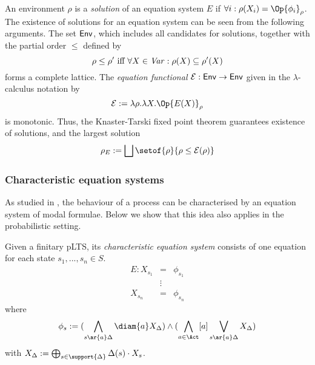 \documentclass{article}
\def \Var{{\it Var}}
\newcommand{\Env}{{\sf Env}}
\def \CE{{\cal E}}
\newcommand{\boxm}[1]{[#1]}
\begin{document}
An environment $\rho$ is a {\em solution} of an equation system $E$
if $\forall i:\rho(X_i) = \Op{\phi_i}_\rho$. The existence of
solutions for an equation system can be seen from the following
arguments. The set $\Env$, which includes all candidates for
solutions, together with the partial order $\leq$ defined by
\[\rho\leq\rho'\ \mbox{\rm  iff}\ \forall
X\in\Var:\rho(X)\subseteq\rho'(X)\] forms a complete lattice. The
{\em equation functional} $\CE:\Env\rightarrow \Env$ given in the
$\lambda$-calculus notation by \[\CE:=\lambda\rho.\lambda
X.\Op{E(X)}_\rho\] is monotonic. Thus, the Knaster-Tarski fixed
point theorem guarantees existence of solutions, and the largest
solution
\[\rho_E:= \bigsqcup \setof{\rho}{\rho\leq\CE(\rho)}\]


\subsubsection{Characteristic equation systems}\label{s:ces} As
studied in \cite{SI94}, the behaviour of a process can be
characterised by an equation system of modal formulae. Below we show
that this idea also applies in the probabilistic setting.

\begin{definition}\label{d:cess}
Given a finitary  pLTS, its {\em characteristic equation system}
consists of one equation for each state $s_1,...,s_n\in S$.
\[\begin{array}{rcl}
E: X_{s_1} & = & \phi_{s_1} \\
       & \vdots & \\
   X_{s_n} & = & \phi_{s_n}
\end{array}\]
where
\begin{equation}\label{e:cf}
\phi_s:=(\bigwedge_{s\ar{a}\Delta}\diam{a}X_{\Delta})\wedge
(\bigwedge_{a\in\Act}\boxm{a}\bigvee_{s\ar{a}\Delta} X_{\Delta} )
\end{equation}
with $X_\Delta := \bigoplus_{s\in\support{\Delta}}\Delta(s)\cdot
X_s$.
\end{definition}
\end{document}
